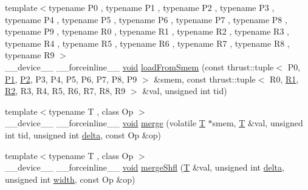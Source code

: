 \begin{DoxyCompactItemize}
{\footnotesize template$<$typename P0 , typename P1 , typename P2 , typename P3 , typename P4 , typename P5 , typename P6 , typename P7 , typename P8 , typename P9 , typename R0 , typename R1 , typename R2 , typename R3 , typename R4 , typename R5 , typename R6 , typename R7 , typename R8 , typename R9 $>$ }\\\-\_\-\-\_\-device\-\_\-\-\_\- \-\_\-\-\_\-forceinline\-\_\-\-\_\- \hyperlink{legacy_8hpp_a8bb47f092d473522721002c86c13b94e}{void} \hyperlink{namespacecv_1_1gpu_1_1device_1_1reduce__detail_a5480136de68a47e7f32ac4a53571682b}{load\-From\-Smem} (const thrust\-::tuple$<$ P0, \hyperlink{calib3d_8hpp_a81046431a4ff9a0e8b93536f19efac38}{P1}, \hyperlink{calib3d_8hpp_a704ac1a3954b1c810117417a050e7f76}{P2}, P3, P4, P5, P6, P7, P8, P9 $>$ \&smem, const thrust\-::tuple$<$ R0, \hyperlink{calib3d_8hpp_ab4d5cbb79188a091449ea6430cd5ec59}{R1}, \hyperlink{calib3d_8hpp_a08847b11703596b1db049ef98d450eaa}{R2}, R3, R4, R5, R6, R7, R8, R9 $>$ \&val, unsigned int tid)
\item 
{\footnotesize template$<$typename T , class Op $>$ }\\\-\_\-\-\_\-device\-\_\-\-\_\- \-\_\-\-\_\-forceinline\-\_\-\-\_\- \hyperlink{legacy_8hpp_a8bb47f092d473522721002c86c13b94e}{void} \hyperlink{namespacecv_1_1gpu_1_1device_1_1reduce__detail_a5da421bdac170cb8c318e91e77c31fe6}{merge} (volatile \hyperlink{calib3d_8hpp_a3efb9551a871ddd0463079a808916717}{T} $\ast$smem, \hyperlink{calib3d_8hpp_a3efb9551a871ddd0463079a808916717}{T} \&val, unsigned int tid, unsigned int \hyperlink{legacy_8hpp_ac867054f00f4be8b1f3ebce6fba31982}{delta}, const Op \&op)
\item 
{\footnotesize template$<$typename T , class Op $>$ }\\\-\_\-\-\_\-device\-\_\-\-\_\- \-\_\-\-\_\-forceinline\-\_\-\-\_\- \hyperlink{legacy_8hpp_a8bb47f092d473522721002c86c13b94e}{void} \hyperlink{namespacecv_1_1gpu_1_1device_1_1reduce__detail_a161a9b41c39044b65c1ba8839611a6e4}{merge\-Shfl} (\hyperlink{calib3d_8hpp_a3efb9551a871ddd0463079a808916717}{T} \&val, unsigned int \hyperlink{legacy_8hpp_ac867054f00f4be8b1f3ebce6fba31982}{delta}, unsigned int \hyperlink{highgui__c_8h_a2474a5474cbff19523a51eb1de01cda4}{width}, const Op \&op)
\item 

\end{DoxyCompactItemize}
